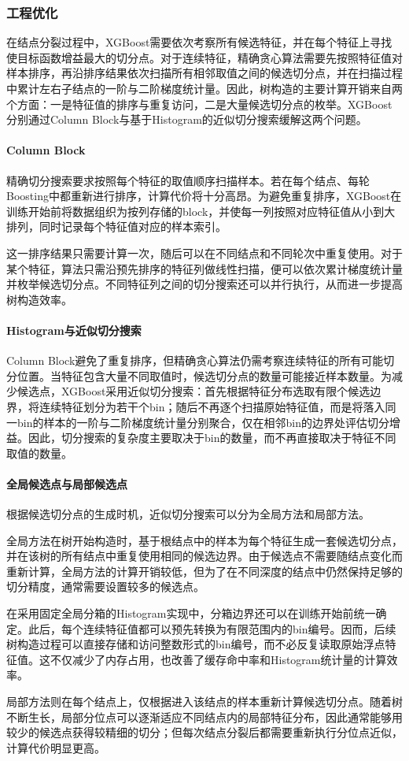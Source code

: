 \subsubsection{工程优化}
在结点分裂过程中，XGBoost需要依次考察所有候选特征，并在每个特征上寻找使目标函数增益最大的切分点。对于连续特征，精确贪心算法需要先按照特征值对样本排序，再沿排序结果依次扫描所有相邻取值之间的候选切分点，并在扫描过程中累计左右子结点的一阶与二阶梯度统计量。因此，树构造的主要计算开销来自两个方面：一是特征值的排序与重复访问，二是大量候选切分点的枚举。XGBoost分别通过Column Block与基于Histogram的近似切分搜索缓解这两个问题。\par
\paragraph{Column Block}
精确切分搜索要求按照每个特征的取值顺序扫描样本。若在每个结点、每轮Boosting中都重新进行排序，计算代价将十分高昂。为避免重复排序，XGBoost在训练开始前将数据组织为按列存储的block，并使每一列按照对应特征值从小到大排列，同时记录每个特征值对应的样本索引。\par
这一排序结果只需要计算一次，随后可以在不同结点和不同轮次中重复使用。对于某个特征，算法只需沿预先排序的特征列做线性扫描，便可以依次累计梯度统计量并枚举候选切分点。不同特征列之间的切分搜索还可以并行执行，从而进一步提高树构造效率。\par
\paragraph{Histogram与近似切分搜索}
Column Block避免了重复排序，但精确贪心算法仍需考察连续特征的所有可能切分位置。当特征包含大量不同取值时，候选切分点的数量可能接近样本数量。为减少候选点，XGBoost采用近似切分搜索：首先根据特征分布选取有限个候选边界，将连续特征划分为若干个bin；随后不再逐个扫描原始特征值，而是将落入同一bin的样本的一阶与二阶梯度统计量分别聚合，仅在相邻bin的边界处评估切分增益。因此，切分搜索的复杂度主要取决于bin的数量，而不再直接取决于特征不同取值的数量。\par
\paragraph{全局候选点与局部候选点}
根据候选切分点的生成时机，近似切分搜索可以分为全局方法和局部方法。\par
全局方法在树开始构造时，基于根结点中的样本为每个特征生成一套候选切分点，并在该树的所有结点中重复使用相同的候选边界。由于候选点不需要随结点变化而重新计算，全局方法的计算开销较低，但为了在不同深度的结点中仍然保持足够的切分精度，通常需要设置较多的候选点。\par
在采用固定全局分箱的Histogram实现中，分箱边界还可以在训练开始前统一确定。此后，每个连续特征值都可以预先转换为有限范围内的bin编号。因而，后续树构造过程可以直接存储和访问整数形式的bin编号，而不必反复读取原始浮点特征值。这不仅减少了内存占用，也改善了缓存命中率和Histogram统计量的计算效率。\par
局部方法则在每个结点上，仅根据进入该结点的样本重新计算候选切分点。随着树不断生长，局部分位点可以逐渐适应不同结点内的局部特征分布，因此通常能够用较少的候选点获得较精细的切分；但每次结点分裂后都需要重新执行分位点近似，计算代价明显更高。\par
